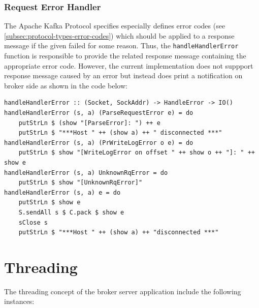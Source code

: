 \subsubsection{Request Error Handler}

The Apache Kafka Protocol specifies especially
defines error codes (see \ref{subsec:protocol-types-error-codes}) which should
be applied to a response message if the given failed for some reason. Thus, the
\lstinline{handleHandlerError} function is responsible to provide the related
response message containing the appropriate error code. However, the current
implementation does not suppport response message caused by an error but instead
does print a notification on broker side as shown in the code below:

\begin{lstlisting}[caption={Catching error of type HandleError}]
handleHandlerError :: (Socket, SockAddr) -> HandleError -> IO()
handleHandlerError (s, a) (ParseRequestError e) = do
    putStrLn $ (show "[ParseError]: ") ++ e
    putStrLn $ "***Host " ++ (show a) ++ " disconnected ***"
handleHandlerError (s, a) (PrWriteLogError o e) = do
    putStrLn $ show "[WriteLogError on offset " ++ show o ++ "]: " ++ show e
handleHandlerError (s, a) UnknownRqError = do
    putStrLn $ show "[UnknownRqError]"
handleHandlerError (s, a) e = do
    putStrLn $ show e
    S.sendAll s $ C.pack $ show e
    sClose s
    putStrLn $ "***Host " ++ (show a) ++ "disconnected ***"
\end{lstlisting}


\section{Threading}
\label{sec:impl-broker-threading}
The threading concept of the broker server application include the following
instances: 

